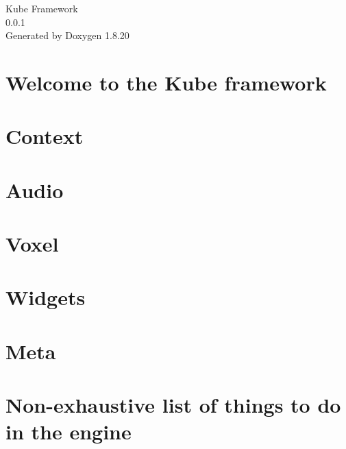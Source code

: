 \let\mypdfximage\pdfximage\def\pdfximage{\immediate\mypdfximage}\documentclass[twoside]{book}
\newcommand{\+}{\discretionary{\mbox{\scriptsize$\hookleftarrow$}}{}{}}
\newcommand{\clearemptydoublepage}{%
  \newpage{\pagestyle{empty}\cleardoublepage}%
}
\begin{document}
\hypersetup{pageanchor=false,
             bookmarksnumbered=true,
             pdfencoding=unicode
            }
\begin{titlepage}
\vspace*{7cm}
\begin{center}%
{\Large Kube Framework \\[1ex]\large 0.\+0.\+1 }\\
\vspace*{1cm}
{\large Generated by Doxygen 1.8.20}\\
\end{center}
\end{titlepage}
\clearemptydoublepage
{}
\tableofcontents
\clearemptydoublepage
{}
\hypersetup{pageanchor=true}

\chapter{Welcome to the Kube framework}
\label{index}\hypertarget{index}{}
\chapter{Context}
\label{md__c_o_n_t_e_x_t}

\chapter{Audio}
\label{md__kube__audio__r_e_a_d_m_e}

\chapter{Voxel}
\label{md__kube__voxel__r_e_a_d_m_e}

\chapter{Widgets}
\label{md__kube__widgets__r_e_a_d_m_e}

\chapter{Meta}
\label{md__meta}

\chapter{Non-\/exhaustive list of things to do in the engine}
\label{md__t_o_d_o}

\end{document}
